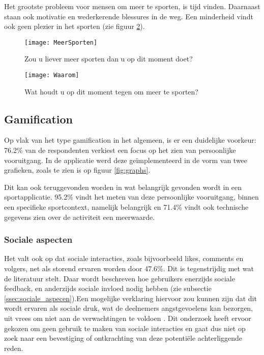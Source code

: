 Het grootste probleem voor mensen om meer te sporten, is tijd vinden. Daarnaast staan ook motivatie en wederkerende blessures in de weg. Een minderheid vindt ook geen plezier in het sporten (zie figuur \ref{fig:waarom}).

\begin{figure}[h]
    \caption[Zou u liever meer sporten dan u op dit moment doet?]{Zou u liever meer sporten dan u op dit moment doet?}
    \texttt{[image: MeerSporten]}
    \label{fig:meerBewegen}
\end{figure}

\begin{figure}[h]
    \caption[Wat houdt u op dit moment tegen om meer te sporten?]{Wat houdt u op dit moment tegen om meer te sporten?}
    \texttt{[image: Waarom]}
    \label{fig:waarom}
\end{figure}

\subsection{Gamification}

Op vlak van het type gamification in het algemeen, is er een duidelijke voorkeur: 76.2\% van de respondenten verkiest een focus op het zien van persoonlijke vooruitgang. In de applicatie werd deze geïmplementeerd in de vorm van twee grafieken, zoals te zien is op figuur \ref{fig:graphs}.

Dit kan ook teruggevonden worden in wat belangrijk gevonden wordt in een sportapplicatie. 95.2\% vindt het meten van deze persoonlijke vooruitgang, binnen een specifieke sportcontext, namelijk belangrijk en 71.4\% vindt ook technische gegevens zien over de activiteit een meerwaarde.

\subsubsection{Sociale aspecten}

Het valt ook op dat sociale interacties, zoals bijvoorbeeld likes, comments en volgers, net als storend ervaren worden door 47.6\%. Dit is tegenstrijdig met wat de literatuur stelt. Daar wordt beschreven hoe gebruikers enerzijds sociale feedback, en anderzijds sociale invloed nodig hebben (zie subsectie \ref{ssec:sociale_aspecen}).Een mogelijke verklaring hiervoor zou kunnen zijn dat dit wordt ervaren als sociale druk, wat de deelnemers angstgevoelens kan bezorgen, uit vrees om niet aan de verwachtingen te voldoen \autocite{Jong2010}. Dit onderzoek heeft ervoor gekozen om geen gebruik te maken van sociale interacties en gaat dus niet op zoek naar een bevestiging of ontkrachting van deze potentiële achterliggende reden.

